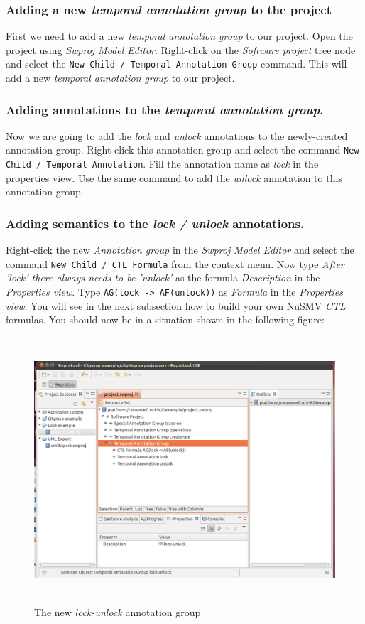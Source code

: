 \subsubsection{Adding a new \emph{temporal annotation group} to the project}
First we need to add a new \emph{temporal annotation group} to our project. Open the project using \emph{Swproj Model Editor}.
Right-click on the \emph{Software project} tree node and select the \texttt{New Child / Temporal Annotation Group} command.
This will add a new \emph{temporal annotation group} to our project.

\subsubsection{Adding annotations to the \emph{temporal annotation group}.}
Now we are going to add the \emph{lock} and \emph{unlock} annotations to the newly-created annotation group. Right-click this annotation
group and select the command \texttt{New Child / Temporal Annotation}. Fill the annotation name as \emph{lock} in the properties
view. Use the same command to add the \emph{unlock} annotation to this annotation group.

\subsubsection{Adding semantics to the \emph{lock / unlock} annotations.}
Right-click the new \emph{Annotation group} in the \emph{Swproj Model Editor} and select the command \texttt{New Child / CTL Formula}
from the context menu. Now type \emph{After 'lock' there always needs to be 'unlock'} as the formula \emph{Description} in the
\emph{Properties view}. Type \texttt{AG(lock -> AF(unlock))} as \emph{Formula} in the \emph{Properties view}. You will see in the
next subsection how to build your own NuSMV \emph{CTL} formulas.
You should now be in a situation shown in the following figure:

\newpage

\begin{figure}[ht]
  \centering
  \includegraphics[height=280pt]{images/reprotoolLockUnlock}
  \caption{The new \emph{lock-unlock} annotation group}
  \label{fig:reprotoolLockUnlock}
\end{figure}

